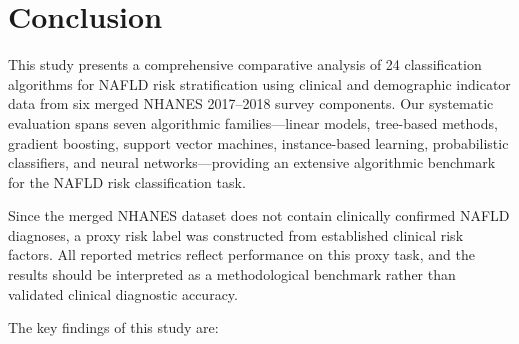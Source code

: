 \documentclass[conference,10pt]{IEEEtran}
\begin{document}
\section{Conclusion}
\label{sec:conclusion}

This study presents a comprehensive comparative analysis of 24 classification algorithms for NAFLD risk stratification using clinical and demographic indicator data from six merged NHANES 2017--2018 survey components. Our systematic evaluation spans seven algorithmic families---linear models, tree-based methods, gradient boosting, support vector machines, instance-based learning, probabilistic classifiers, and neural networks---providing an extensive algorithmic benchmark for the NAFLD risk classification task.

Since the merged NHANES dataset does not contain clinically confirmed NAFLD diagnoses, a proxy risk label was constructed from established clinical risk factors. All reported metrics reflect performance on this proxy task, and the results should be interpreted as a methodological benchmark rather than validated clinical diagnostic accuracy.

The key findings of this study are:
\end{document}
